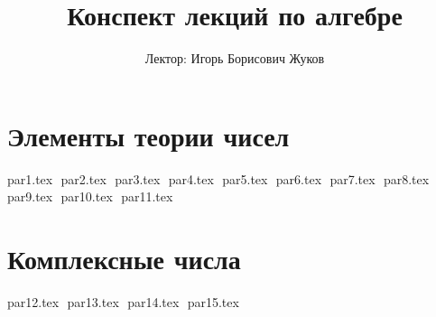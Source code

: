 \documentclass[12pt, letterpaper]{report}
\title{Конспект лекций по алгебре}
\author{Лектор: Игорь Борисович Жуков}
\date{}
\theoremstyle{definition}
\begin{document}
\maketitle

\newpage
\pagestyle{plain}

\tableofcontents

\newpage
\begin{normalsize}

\chapter*{Элементы теории чисел}

{par1.tex}
$ $
{par2.tex}
$ $
{par3.tex}
$ $
{par4.tex}
$ $
{par5.tex}
$ $
{par6.tex}
$ $
{par7.tex}
$ $
{par8.tex}
$ $
{par9.tex}
$ $
{par10.tex}
$ $
{par11.tex}
$ $

\chapter*{Комплексные числа}

{par12.tex}
$ $
{par13.tex}
$ $
{par14.tex}
$ $
{par15.tex}
$ $

\end{normalsize}
\end{document}
